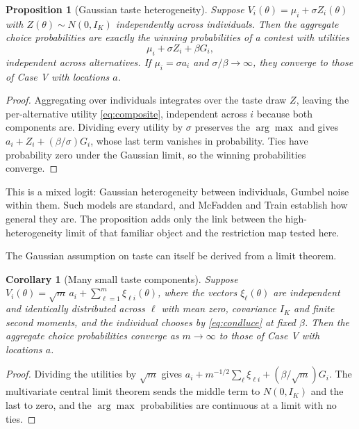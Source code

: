 \documentclass[11pt]{article}
\theoremstyle{italichead}
\newtheorem{proposition}{Proposition}
\newtheorem{corollary}{Corollary}
\begin{document}
\begin{proposition}[Gaussian taste heterogeneity]
\label{prop:mixture}
Suppose $V_i(\theta) = \mu_i + \sigma Z_i(\theta)$ with $Z(\theta) \sim N(0,I_K)$
independently across individuals. Then the aggregate choice probabilities are exactly the
winning probabilities of a contest with utilities
\begin{equation}
\mu_i + \sigma Z_i + \beta G_i ,
\label{eq:composite}
\end{equation}
independent across alternatives. If $\mu_i = \sigma a_i$ and $\sigma/\beta \to \infty$, they
converge to those of Case V with locations $a$.
\end{proposition}

\begin{proof}
Aggregating over individuals integrates over the taste draw $Z$, leaving the
per-alternative utility \eqref{eq:composite}, independent across $i$ because both
components are. Dividing every utility by $\sigma$ preserves the $\arg\max$ and gives
$a_i + Z_i + (\beta/\sigma)G_i$, whose last term vanishes in probability. Ties have
probability zero under the Gaussian limit, so the winning probabilities converge.
\end{proof}

This is a mixed logit: Gaussian heterogeneity between individuals, Gumbel noise within
them. Such models are standard, and McFadden and Train \cite{mcfaddentrain2000} establish
how general they are. The proposition adds only the link between the high-heterogeneity limit of
that familiar object and the restriction map tested here.

The Gaussian assumption on taste can itself be derived from a limit theorem.

\begin{corollary}[Many small taste components]
\label{cor:clt}
Suppose $V_i(\theta) = \sqrt{m}\,a_i + \sum_{\ell=1}^{m}\xi_{\ell i}(\theta)$, where the
vectors $\xi_\ell(\theta)$ are independent and identically distributed across $\ell$ with mean
zero, covariance $I_K$ and finite second moments, and the individual chooses by \eqref{eq:condluce} at fixed
$\beta$. Then the aggregate choice probabilities converge as $m \to \infty$ to those of
Case V with locations $a$.
\end{corollary}

\begin{proof}
Dividing the utilities by $\sqrt{m}$ gives
$a_i + m^{-1/2}\sum_\ell \xi_{\ell i} + (\beta/\sqrt{m})G_i$. The multivariate central limit
theorem sends the middle term to $N(0,I_K)$ and the last to zero, and the $\arg\max$
probabilities are continuous at a limit with no ties.
\end{proof}
\end{document}
